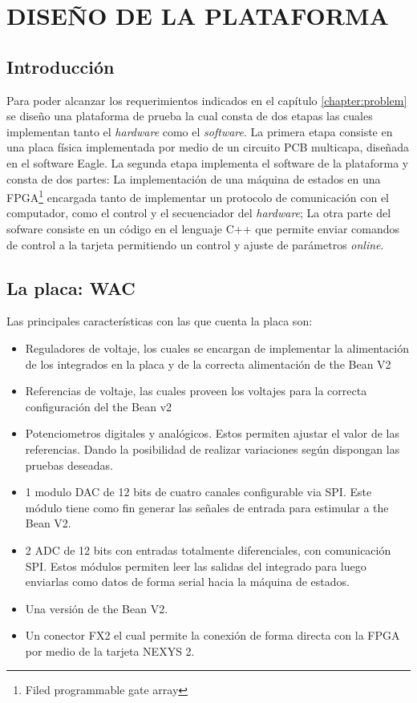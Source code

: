 \chapter{DISEÑO DE LA PLATAFORMA}
\label{chapter:filter}
\section{Introducción}



Para poder alcanzar los requerimientos indicados en el capítulo \ref{chapter:problem} se diseño una plataforma de prueba la cual consta de dos etapas las cuales implementan tanto el \textit{hardware} como el \textit{software}. La primera etapa consiste en una placa física implementada por medio de un circuito PCB multicapa, diseñada en el software Eagle. La segunda etapa implementa el software de la plataforma y consta de dos partes: La implementación de una máquina de estados en una FPGA\footnote{Filed programmable gate array} encargada tanto de implementar un protocolo de comunicación con el computador, como el control y el secuenciador del \textit{hardware}; La otra parte del sofware consiste en un código en el lenguaje C++ que permite enviar comandos de control a la tarjeta permitiendo un control y ajuste de parámetros \textit{online}.



\section{La placa: WAC}
 Las principales características con las que cuenta la placa son:
\begin{itemize}
\item Reguladores de voltaje, los cuales se encargan de implementar la alimentación de los integrados en la placa y de la correcta alimentación de the Bean V2
\item Referencias de voltaje, las cuales proveen los voltajes para la correcta configuración del the Bean v2
\item Potenciometros digitales y analógicos. Estos permiten ajustar el valor de las referencias. Dando la posibilidad de realizar variaciones según dispongan las pruebas deseadas.
\item 1 modulo DAC de 12 bits de cuatro canales configurable via SPI. Este módulo tiene como fin generar las señales de entrada para estimular a the Bean V2.
\item 2 ADC de 12 bits con entradas totalmente diferenciales, con comunicación SPI. Estos módulos permiten leer las salidas del integrado para luego enviarlas como datos de forma serial hacia la máquina de estados.
\item Una versión de the Bean V2.
\item Un conector FX2 el cual permite la conexión de forma directa con la FPGA por medio de la tarjeta NEXYS 2.
\end{itemize}



